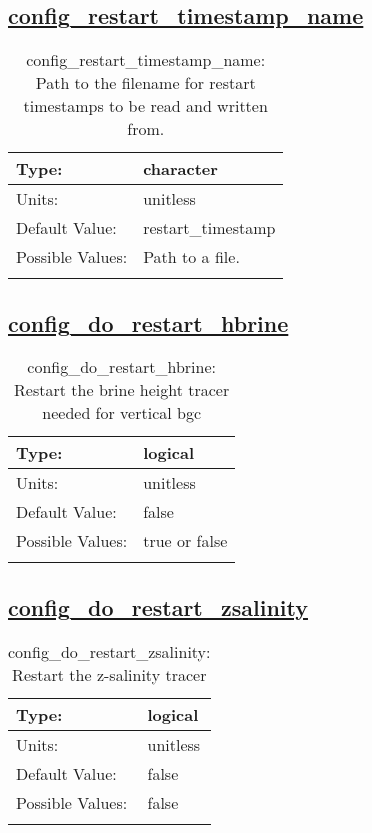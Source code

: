 \subsection[config\_restart\_timestamp\_name]{\hyperref[sec:nm_tab_restart]{config\_restart\_timestamp\_name}}
\label{subsec:nm_sec_config_restart_timestamp_name}
\begin{center}
\begin{longtable}{| p{2.0in} || p{4.0in} |}
    \hline
    Type: & character \\
    \hline
    Units: & \si{unitless} \\
    \hline
    Default Value: & restart\_timestamp \\
    \hline
    Possible Values: & Path to a file. \\
    \hline
    \caption{config\_restart\_timestamp\_name: Path to the filename for restart timestamps to be read and written from.}
\end{longtable}
\end{center}
\subsection[config\_do\_restart\_hbrine]{\hyperref[sec:nm_tab_restart]{config\_do\_restart\_hbrine}}
\label{subsec:nm_sec_config_do_restart_hbrine}
\begin{center}
\begin{longtable}{| p{2.0in} || p{4.0in} |}
    \hline
    Type: & logical \\
    \hline
    Units: & \si{unitless} \\
    \hline
    Default Value: & false \\
    \hline
    Possible Values: & true or false \\
    \hline
    \caption{config\_do\_restart\_hbrine: Restart the brine height tracer needed for vertical bgc}
\end{longtable}
\end{center}
\subsection[config\_do\_restart\_zsalinity]{\hyperref[sec:nm_tab_restart]{config\_do\_restart\_zsalinity}}
\label{subsec:nm_sec_config_do_restart_zsalinity}
\begin{center}
\begin{longtable}{| p{2.0in} || p{4.0in} |}
    \hline
    Type: & logical \\
    \hline
    Units: & \si{unitless} \\
    \hline
    Default Value: & false \\
    \hline
    Possible Values: & false \\
    \hline
    \caption{config\_do\_restart\_zsalinity: Restart the z-salinity tracer}
\end{longtable}
\end{center}
